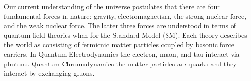 
Our current understanding of the universe postulates that there are four fundamental forces in nature: gravity, electromagnetism, the strong nuclear force, and the weak nuclear force.
The latter three forces are understood in terms of quantum field theories whch for the Standard Model (SM).
Each theory describes the world as consisting of fermionic matter particles coupled by bosonic force carriers.
In Quantum Electrodynamics the electron, muon, and tau interact via photons.
Quantum Chromodynamics the matter particles are quarks and they interact by exchanging gluons.



